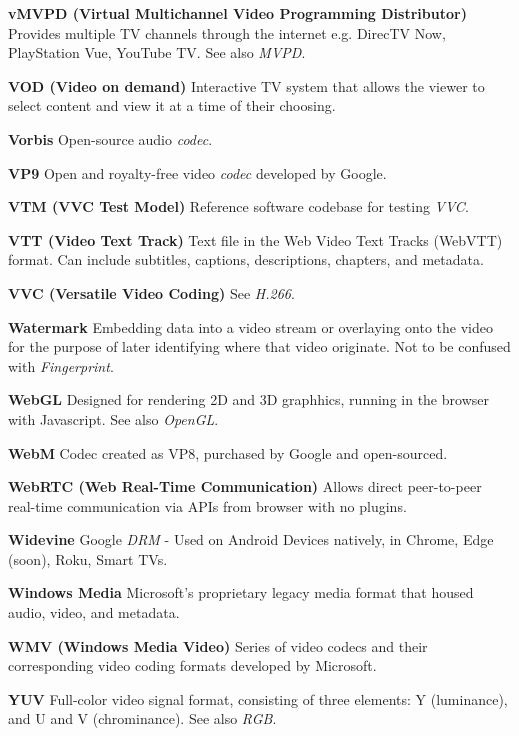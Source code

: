 \smallskip
\textbf{vMVPD (Virtual Multichannel Video Programming Distributor)}
Provides multiple TV channels through the internet e.g. DirecTV Now, PlayStation Vue, YouTube TV. See also \textit{MVPD}.

\smallskip
\textbf{VOD (Video on demand)}
Interactive TV system that allows the viewer to select content and view it at a time of their choosing.

\smallskip
\textbf{Vorbis}
Open-source audio \textit{codec}.

\smallskip
\textbf{VP9}
Open and royalty-free video \textit{codec} developed by Google.

\smallskip
\textbf{VTM (VVC Test Model)}
Reference software codebase for testing \textit{VVC}.

\smallskip
\textbf{VTT (Video Text Track)}
Text file in the Web Video Text Tracks (WebVTT) format. Can include subtitles, captions, descriptions, chapters, and metadata.

\smallskip
\textbf{VVC (Versatile Video Coding)}
See \textit{H.266}.



\textbf{Watermark}
Embedding data into a video stream or overlaying onto the video for the purpose of later identifying where that video originate. Not to be confused with \textit{Fingerprint}.

\smallskip
\textbf{WebGL}
Designed for rendering 2D and 3D graphhics, running in the browser with Javascript. See also \textit{OpenGL}.

\smallskip
\textbf{WebM}
Codec created as VP8, purchased by Google and open-sourced.

\smallskip
\textbf{WebRTC (Web Real-Time Communication)}
Allows direct peer-to-peer real-time communication via APIs from browser with no plugins.

\smallskip
\textbf{Widevine}
Google \textit{DRM} - Used on Android Devices natively, in Chrome, Edge (soon), Roku, Smart TVs.

\smallskip
\textbf{Windows Media}
Microsoft's proprietary legacy media format that housed audio, video, and metadata.

\smallskip
\textbf{WMV (Windows Media Video)}
Series of video codecs and their corresponding video coding formats developed by Microsoft.

\smallskip
\textbf{YUV}
Full-color video signal format, consisting of three elements: Y (luminance), and U and V (chrominance). See also \textit{RGB}.
